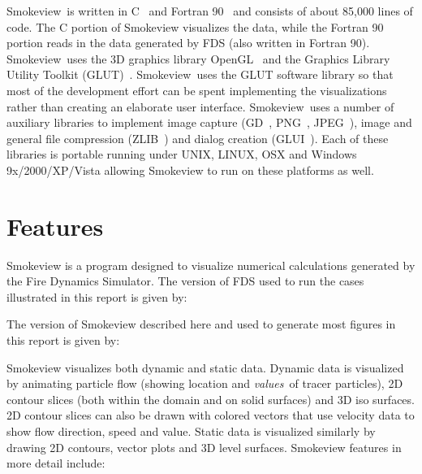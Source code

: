 \documentclass[11pt,twoside]{book}
\newcommand{\Smokeview}{{Smokeview}}
\newcommand{\smokeview}{{Smokeview}}
\begin{document}
\Smokeview\ is written in C~\cite{C:book} and Fortran 90~\cite{Fortran:book} and consists of about
85,000 lines of code. The C portion of Smokeview visualizes the
data, while the Fortran 90 portion reads in the data generated by
FDS (also written in Fortran 90). \smokeview\ uses the 3D graphics
library OpenGL~\cite{OpenGLRed} and the Graphics Library Utility
Toolkit (GLUT)~\cite{OpenGLGlut}. \Smokeview\ uses the GLUT
software library so that most of the development effort can be
spent implementing the visualizations rather than creating an
elaborate user interface.  \Smokeview\ uses a number of auxiliary
libraries to implement image capture (GD~\cite{BOUTELL,GDLIB},
PNG~\cite{PNGLIB}, JPEG~\cite{JPEGLIB}), image and general file
compression (ZLIB~\cite{ZLIB}) and dialog creation
(GLUI~\cite{GLUILIB}). Each of these libraries is portable running
under UNIX, LINUX, OSX and Windows 9x/2000/XP/Vista allowing Smokeview to run
on these platforms as well.

\section{Features}

Smokeview is a program designed to visualize numerical
calculations generated by the Fire Dynamics Simulator.
The version of FDS used to run the cases illustrated  in this report
is given by:
{

}
The version of Smokeview described here and used
to generate most figures in this report is given by:
{

}

Smokeview visualizes both dynamic and static data.  Dynamic
data is visualized by animating particle flow (showing
location and {\em values}\ of tracer particles), 2D contour
slices (both within the domain and on solid surfaces) and
3D iso surfaces.  2D contour slices can also be drawn
with colored vectors that use velocity data to show flow
direction, speed and value. Static data is visualized
similarly by drawing 2D contours, vector plots and 3D level
surfaces. Smokeview features in more detail include:
\end{document}
